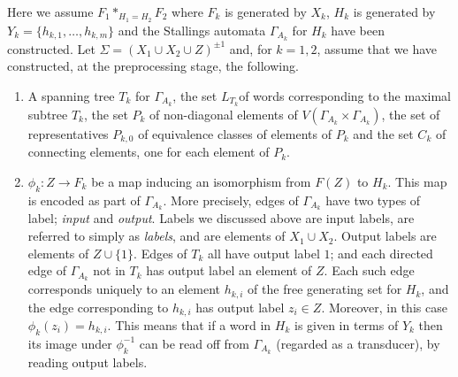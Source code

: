\documentclass[a4paper,12pt]{article}
\newcommand{\G}{\Gamma }
\renewcommand{\S}{\Sigma }
\numberwithin{equation}{section}
\numberwithin{figure}{section}
\newcommand{\maps}{\rightarrow}
\newcommand{\be}{\begin{enumerate}}
\newcommand{\ee}{\end{enumerate}}
\begin{document}
Here we assume $F_1*_{H_1=H_2} F_2$
 where $F_k$ is generated by $X_k$, $H_k$ is generated
by $Y_k=\{h_{k,1},\ldots, h_{k,m}\}$
and the Stallings automata $\G_{A_k}$ for $H_k$ have
been constructed. Let  $\S=(X_1\cup X_2\cup Z)^{\pm 1}$ and, for $k=1,2$,
assume that we have constructed, at the preprocessing stage, the following.
\be
\item
A spanning tree  $T_k$ for $\G_{A_k}$,
 the set $L_{T_k}$of words corresponding to the  maximal subtree $T_k$,
the set $P_k$ of non-diagonal elements of
$V( \G_{A_k}\times \G_{A_k})$,
 the set of representatives  $P_{k,0}$ of equivalence classes of
elements of $P_k$ and the
set $C_k$ of connecting elements, one for each element of $P_k$.
\item $\phi_k:Z\maps F_k$ be a map inducing an isomorphism from $F(Z)$ to
$H_k$. This map is encoded as part of $\G_{A_k}$. More precisely,
edges of $\G_{A_k}$ have two types of label; \emph{input} and \emph{output}.
Labels we discussed above are input labels, are
referred to simply as \emph{labels}, and are elements of $X_1\cup X_2$.
Output labels are elements of  $Z\cup \{1\}$.
 Edges of $T_k$  all have output label $1$; and each directed
edge of $\G_{A_k}$ not in $T_k$ has output
label an element of $Z$. Each such edge corresponds uniquely to
 an element $h_{k,i}$ of the free generating set for $H_k$, and the edge
corresponding to $h_{k,i}$ has
 output label  $z_i\in Z$. Moreover, in this case $\phi_k(z_i)=h_{k,i}$.
  This means that if a word in $H_k$ is given in terms of $Y_k$  then its
image under $\phi_k^{-1}$ can be read off from $\G_{A_k}$ (regarded as a
 transducer), by reading output labels.
\ee
\end{document}
